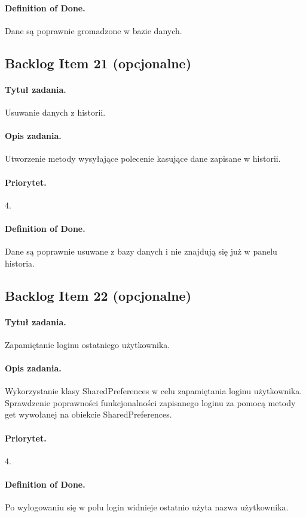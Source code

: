 \documentclass[a4paper]{article}
\begin{document}
\paragraph{Definition of Done.} Dane są poprawnie gromadzone w bazie danych.

\subsection{Backlog Item 21 (opcjonalne)}
\paragraph{Tytuł zadania.} Usuwanie danych z historii.
\paragraph{Opis zadania.} Utworzenie metody wysyłające polecenie kasujące dane zapisane w historii.
\paragraph{Priorytet.} 4.
\paragraph{Definition of Done.} Dane są poprawnie usuwane z bazy danych i nie znajdują się już w panelu historia.

\subsection{Backlog Item 22 (opcjonalne)}
\paragraph{Tytuł zadania.} Zapamiętanie loginu ostatniego użytkownika.
\paragraph{Opis zadania.} Wykorzystanie klasy SharedPreferences w celu zapamiętania loginu użytkownika. Sprawdzenie poprawności funkcjonalności zapisanego loginu za pomocą metody get wywołanej na obiekcie SharedPreferences.
\paragraph{Priorytet.} 4.
\paragraph{Definition of Done.} Po wylogowaniu się w polu login widnieje ostatnio użyta nazwa użytkownika.
\end{document}
